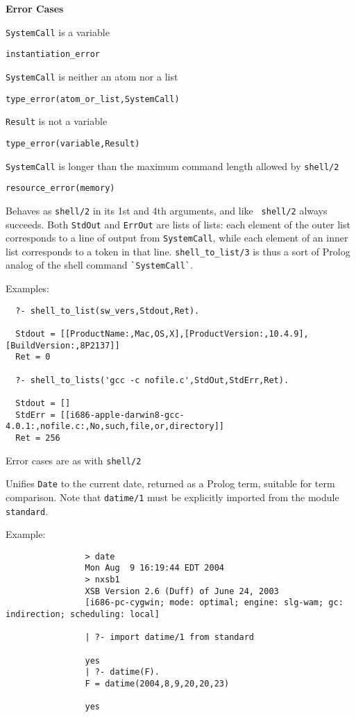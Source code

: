 \begin{description}
{\bf Error Cases}
\bi
\item  {\tt SystemCall} is a variable
\bi
\item {\tt instantiation\_error}
\ei
\item {\tt SystemCall} is neither an atom nor a list
\bi
\item {\tt type\_error(atom\_or\_list,SystemCall)}
\ei
\item {\tt Result} is not a variable
\bi
\item {\tt type\_error(variable,Result)}
\ei
\item {\tt SystemCall} is longer than the maximum command length
  allowed by {\tt shell/2}
\bi
\item {\tt resource\_error(memory)}
\ei
\ei


%
Behaves as {\tt shell/2} in its 1st and 4th arguments, and like {\tt
  shell/2} always succeeds.  Both {\tt StdOut} and {\tt ErrOut} are
lists of lists: each element of the outer list corresponds to a line
of output from {\tt SystemCall}, while each element of an inner list
corresponds to a token in that line.  {\tt shell\_to\_list/3} is thus
a sort of Prolog analog of the shell command \verb|`SystemCall`|.

Examples:
\begin{verbatim}
  ?- shell_to_list(sw_vers,Stdout,Ret).

  Stdout = [[ProductName:,Mac,OS,X],[ProductVersion:,10.4.9],[BuildVersion:,8P2137]]
  Ret = 0

  ?- shell_to_lists('gcc -c nofile.c',StdOut,StdErr,Ret).

  Stdout = []
  StdErr = [[i686-apple-darwin8-gcc-4.0.1:,nofile.c:,No,such,file,or,directory]]
  Ret = 256
\end{verbatim}

Error cases are as with {\tt shell/2}

%
Unifies {\tt Date} to the current date, returned as a Prolog term,
suitable for term comparison.  Note that {\tt datime/1} must be
explicitly imported from the module {\tt standard}.

Example:
{\footnotesize
\begin{verbatim}
                > date
                Mon Aug  9 16:19:44 EDT 2004
                > nxsb1
                XSB Version 2.6 (Duff) of June 24, 2003
                [i686-pc-cygwin; mode: optimal; engine: slg-wam; gc: indirection; scheduling: local]

                | ?- import datime/1 from standard

                yes
                | ?- datime(F).
                F = datime(2004,8,9,20,20,23)

                yes
\end{verbatim}}

\end{description}

